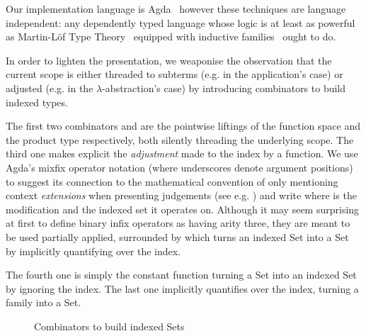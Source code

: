 Our implementation language is Agda~\cite{norell2009dependently} however
these techniques are language independent: any dependently typed language
whose logic is at least as powerful as Martin-L\"of Type
Theory~\cite{martin1982constructive} equipped with inductive
families~\cite{dybjer1994inductive} ought to do.

In order to lighten the presentation, we weaponise the observation that the
current scope is either threaded to subterms (e.g. in the application's case)
or adjusted (e.g. in the $\lambda$-abstraction's case) by introducing combinators
to build indexed types.

The first two combinators  and  are the pointwise liftings
of the function space and the product type respectively, both silently threading
the underlying scope. The third one  makes explicit
the \emph{adjustment} made to the index by a function. We use Agda's mixfix
operator notation (where underscores denote argument positions) to suggest its
connection to the mathematical convention of only mentioning context \emph{extensions}
when presenting judgements (see e.g. \cite{martin1982constructive}) and write
   where  is the modification and  the indexed set
it operates on. Although it may seem surprising at first to define binary
infix operators as having arity three, they are meant to be used partially applied,
surrounded by \AF{[\_]} which turns an indexed Set into a Set by implicitly
quantifying over the index.

The fourth one is simply the constant function turning a Set into an indexed Set
by ignoring the index. The last one implicitly quantifies over the index, turning
a family into a Set.

\begin{figure}[h]
\begin{minipage}{0.45\textwidth}
\end{minipage}\hspace{2em}
\begin{minipage}{0.45\textwidth}
\end{minipage}

\begin{minipage}{0.40\textwidth}
\end{minipage}\hspace{2em}
\begin{minipage}{0.25\textwidth}
\end{minipage}
\begin{minipage}{0.25\textwidth}
\end{minipage}
\caption{Combinators to build indexed Sets}\label{figure:indexed}
\end{figure}


